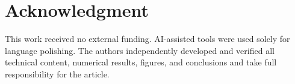 \documentclass[journal]{IEEEtran}
\begin{document}
\section*{Acknowledgment}
This work received no external funding. AI-assisted tools were used solely for language polishing. The authors independently developed and verified all technical content, numerical results, figures, and conclusions and take full responsibility for the article.



\end{document}
